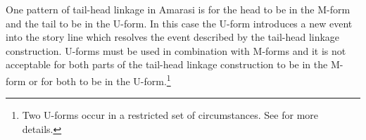 \begin{exe}
\end{exe}

One pattern of tail-head linkage in Amarasi is for the head to be in the M-form
and the tail to be in the U-form.
In this case the U-form introduces a new event into the story line
which resolves the event described by the tail-head linkage construction.
U-forms must be used in combination with M-forms and it is not acceptable
for both parts of the tail-head linkage construction to be in the M-form
or for both to be in the U-form.\footnote{
		Two U-forms occur in a restricted set of circumstances.
		See  for more details.}

